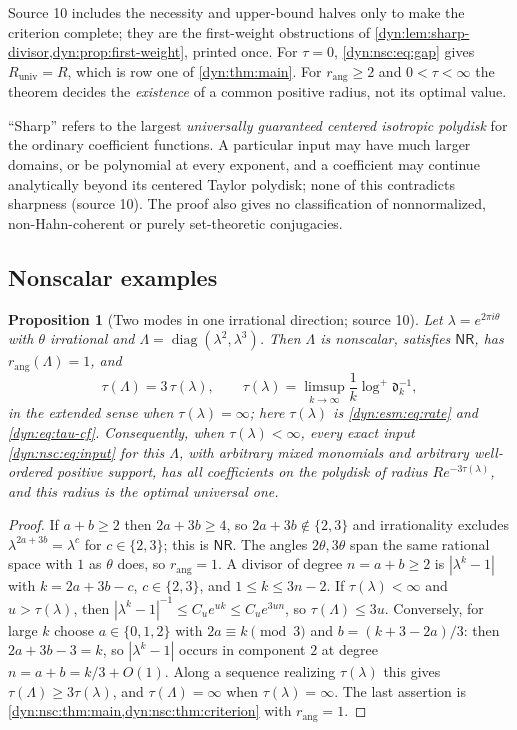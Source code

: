\documentclass[11pt,letterpaper]{article}
\newtheorem{proposition}[proposition]{Proposition}
\theoremstyle{definition}
\theoremstyle{remark}
\newcommand{\nres}{\mathsf{NR}}
\newcommand{\rang}{r_{\mathrm{ang}}}
\numberwithin{equation}{section}
\begin{document}
Source 10 includes the necessity and upper-bound halves only to make the
criterion complete; they are the first-weight obstructions of
\cref{dyn:lem:sharp-divisor,dyn:prop:first-weight}, printed once. For
$\tau=0$, \eqref{dyn:nsc:eq:gap} gives $R_{\mathrm{univ}}=R$, which is row one
of \cref{dyn:thm:main}. For $\rang\ge2$ and $0<\tau<\infty$ the theorem
decides the \emph{existence} of a common positive radius, not its optimal
value.

``Sharp'' refers to the largest \emph{universally guaranteed centered
isotropic polydisk} for the ordinary coefficient functions. A particular
input may have much larger domains, or be polynomial at every exponent, and
a coefficient may continue analytically beyond its centered Taylor
polydisk; none of this contradicts sharpness (source 10). The proof also
gives no classification of nonnormalized, non-Hahn-coherent or purely
set-theoretic conjugacies.

\subsection{Nonscalar examples}
\label{dyn:nsc:subsec:examples}

\begin{proposition}[Two modes in one irrational direction; source 10]
\label{dyn:nsc:prop:twomode}
Let $\lambda=e^{2\pi i\theta}$ with $\theta$ irrational and
$\Lambda=\operatorname{diag}(\lambda^{2},\lambda^{3})$. Then $\Lambda$ is
nonscalar, satisfies $\nres$, has $\rang(\Lambda)=1$, and
\begin{equation}\label{dyn:nsc:eq:twomode}
 \tau(\Lambda)=3\,\tau(\lambda),\qquad
 \tau(\lambda)=\limsup_{k\to\infty}\frac1k\log^{+}\mathfrak d_k^{-1},
\end{equation}
in the extended sense when $\tau(\lambda)=\infty$; here $\tau(\lambda)$ is
\eqref{dyn:esm:eq:rate} and \eqref{dyn:eq:tau-cf}. Consequently, when
$\tau(\lambda)<\infty$, every exact input \eqref{dyn:nsc:eq:input} for this
$\Lambda$, with arbitrary mixed monomials and arbitrary well-ordered positive
support, has all coefficients on the polydisk of radius $Re^{-3\tau(\lambda)}$,
and this radius is the optimal universal one.
\end{proposition}
\begin{proof}
If $a+b\ge2$ then $2a+3b\ge4$, so $2a+3b\notin\{2,3\}$ and irrationality
excludes $\lambda^{2a+3b}=\lambda^{c}$ for $c\in\{2,3\}$; this is $\nres$.
The angles $2\theta,3\theta$ span the same rational space with $1$ as
$\theta$ does, so $\rang=1$. A divisor of degree $n=a+b\ge2$ is
$|\lambda^{k}-1|$ with $k=2a+3b-c$, $c\in\{2,3\}$, and $1\le k\le3n-2$. If
$\tau(\lambda)<\infty$ and $u>\tau(\lambda)$, then
$|\lambda^{k}-1|^{-1}\le C_ue^{uk}\le C_ue^{3un}$, so $\tau(\Lambda)\le3u$.
Conversely, for large $k$ choose $a\in\{0,1,2\}$ with $2a\equiv k\pmod3$
and $b=(k+3-2a)/3$: then $2a+3b-3=k$, so $|\lambda^{k}-1|$ occurs in
component $2$ at degree $n=a+b=k/3+O(1)$. Along a sequence realizing
$\tau(\lambda)$ this gives $\tau(\Lambda)\ge3\tau(\lambda)$, and
$\tau(\Lambda)=\infty$ when $\tau(\lambda)=\infty$. The last assertion is
\cref{dyn:nsc:thm:main,dyn:nsc:thm:criterion} with $\rang=1$.
\end{proof}
\end{document}
